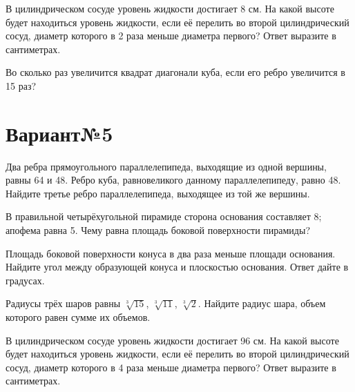 \documentclass[4apaper]{article}
\begin{document}
\begin{taskBN}{5}
В цилиндрическом сосуде уровень жидкости достигает 8 см. На какой высоте будет находиться уровень жидкости, если её перелить во второй цилиндрический сосуд, диаметр которого в 2 раза меньше диаметра первого? Ответ выразите в сантиметрах.
\end{taskBN}

\begin{taskBN}{6}
Во сколько раз увеличится квадрат диагонали куба, если его ребро увеличится в 15 раз?
\end{taskBN}
\newpage\section*{Вариант№5}

\begin{taskBN}{1}
Два ребра прямоугольного параллелепипеда, выходящие из одной вершины, равны 64 и 48. Ребро куба, равновеликого данному параллелепипеду, равно 48. Найдите третье ребро параллелепипеда, выходящее из той же вершины.
\end{taskBN}

\begin{taskBN}{2}
В правильной четырёхугольной пирамиде сторона основания составляет 8; апофема равна 5. Чему равна площадь боковой поверхности пирамиды?
\end{taskBN}

\begin{taskBN}{3}
Площадь боковой поверхности конуса в два раза меньше площади основания. Найдите угол между образующей конуса и плоскостью основания. Ответ дайте в градусах.
\end{taskBN}

\begin{taskBN}{4}
Радиусы трёх шаров равны $\sqrt[3]{15}$, $\sqrt[3]{11}$, $\sqrt[3]{2}$. Найдите радиус шара, объем которого равен сумме их объемов.
\end{taskBN}

\begin{taskBN}{5}
В цилиндрическом сосуде уровень жидкости достигает 96 см. На какой высоте будет находиться уровень жидкости, если её перелить во второй цилиндрический сосуд, диаметр которого в 4 раза меньше диаметра первого? Ответ выразите в сантиметрах.
\end{taskBN}
\end{document}
